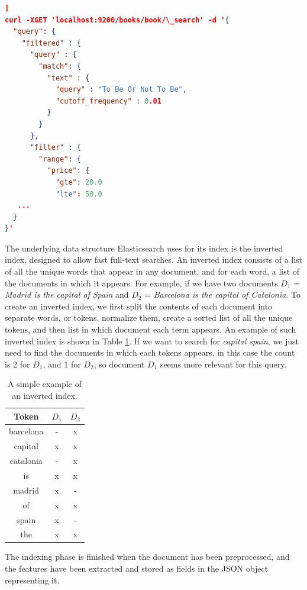 \begin{lstlisting}[language=json,firstnumber=1,caption=Example of a search query specified in DSL in Elasticsearch., label=es-search2]]
curl -XGET 'localhost:9200/books/book/\_search' -d '{
  "query": {
    "filtered" : {
      "query" : {
        "match": {
          "text" : {
            "query" : "To Be Or Not To Be",
            "cutoff_frequency" : 0.01
          }
        }
      },
      "filter" : {
        "range": {
          "price": {
            "gte": 20.0
            "lte": 50.0
   ...
  }
}'
\end{lstlisting}

The underlying data structure Elasticsearch uses for its index is the inverted index, designed to allow fast full-text searches. An inverted index consists of a list of all the unique words that appear in any document, and for each word, a list of the documents in which it appears. For example, if we have two documents $D_1$ = \textit{Madrid is the capital of Spain} and $D_2$ = \textit{Barcelona is the capital of Catalonia}. To create an inverted index, we first split the contents of each document into separate words, or tokens, normalize them, create a sorted list of all the unique tokens, and then list in which document each term appears. An example of such inverted index is shown in Table \ref{tb:inv-index}. If we want to search for \textit{capital spain}, we just need to find the documents in which each tokens appears, in this case the count is 2 for $D_1$, and 1 for $D_2$, so document $D_1$ seems more relevant for this query.

\begin{table}[]
\centering
\caption{A simple example of an inverted index.}
\label{tb:inv-index}
\begin{tabular}{@{}ccc@{}}
\toprule
Token & $D_1$ & $D_2$ \\ \midrule
barcelona & - & x \\
capital & x & x \\
catalonia & - & x \\
is & x & x \\
madrid & x & - \\
of & x & x \\
spain & x & - \\
the & x & x \\ \bottomrule
\end{tabular}
\end{table}

The indexing phase is finished when the document has been preprocessed, and the features have been extracted and stored as fields in the JSON object representing it.

